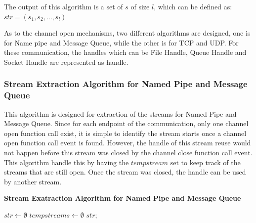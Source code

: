 The output of this algorithm is a set of $s$ of size $l$, which can be defined as:
$str = (s_1, s_2, ..., s_l)$

As to the channel open mechanisms, two different algorithms are designed, one is for Name pipe and Message Queue, while the other is for TCP and UDP. For these communication, the handles which can be File Handle, Queue Handle and Socket Handle are represented as handle.

\subsubsection{Stream Extraction Algorithm for Named Pipe and Message Queue}
This algorithm is designed for extraction of the streams for Named Pipe and Message Queue. Since for each endpoint of the communication, only one channel open function call exist, it is simple to identify the stream starts once a channel open function call event is found. However, the handle of this stream reuse would not happen before this stream was closed by the channel close function call event. This algorithm handle this by having the $tempstream$ set to keep track of the streams that are still open. Once the stream was closed, the handle can be used by another stream.
\begin{algorithm}[H]
\DontPrintSemicolon
\caption{{\bf Stream Exatraction Algorithm for Named Pipe and Message Queue} \label{streamext1}}
$str \leftarrow \emptyset$\; 
$tempstreams \leftarrow \emptyset$ \;  
\KwRet $str$;\;
\end{algorithm} 

